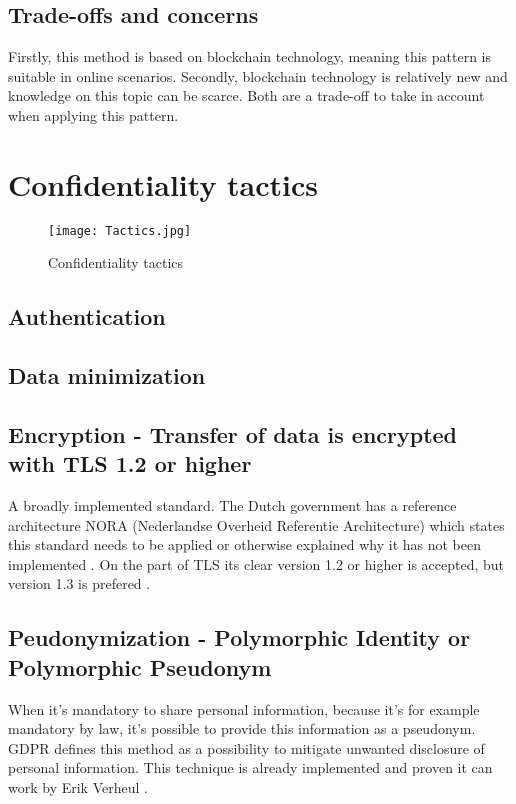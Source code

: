 \subsection{Trade-offs and concerns}
Firstly, this method is based on blockchain technology, meaning this pattern is suitable in online scenarios. Secondly, blockchain technology is relatively new and knowledge on this topic can be scarce. Both are a trade-off to take in account when applying this pattern. 

\section{Confidentiality tactics}
\graphicspath{ {./images/} }
\begin{figure}[t]
\centering
\label{fig:Tactics}
\texttt{[image: Tactics.jpg]}\\
\caption{Confidentiality tactics}
\end{figure}

\subsection{Authentication}

\subsection{Data minimization}

\subsection{Encryption - Transfer of data is encrypted with TLS 1.2 or higher}
A broadly implemented standard. The Dutch government has a reference architecture NORA (Nederlandse Overheid Referentie Architecture) \cite{NORA} which states this standard needs to be applied or otherwise explained why it has not been implemented \cite{NORA_PasToeOfLegUit}. On the part of TLS its clear version 1.2 or higher is accepted, but version 1.3 is prefered \cite{NORA_TLS}. 

\subsection{Peudonymization - Polymorphic Identity or Polymorphic Pseudonym}
When it's mandatory to share personal information, because it's for example mandatory by law, it's possible to provide this information as a pseudonym. GDPR \cite{GDPR} defines this method as a possibility to mitigate unwanted disclosure of personal information. 
This technique is already implemented and proven it can work by Erik Verheul \cite{VerheuleID}. 

